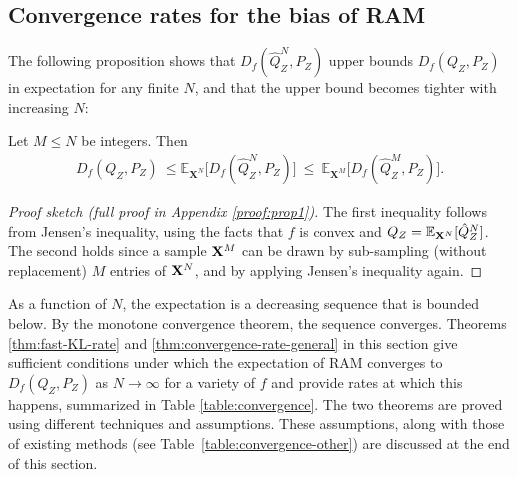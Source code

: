 \subsection{Convergence rates for the bias of RAM}
The following proposition shows that $D_f(\hat{Q}_Z^N , P_Z)$ upper bounds $D_f(Q_{Z} , P_Z)$ in expectation for any finite $N$, and that the upper bound becomes tighter with increasing $N$:
%
\begin{proposition}\label{prop:upper-bound}
Let $M \leq N$ be integers. Then
\begin{align}
\label{eq:our-estimate}
    D_f(Q_Z , P_Z) \ \leq 
    \mathbb{E}_{\mathbf{X}^N} \bigl[D_f(\hat{Q}_Z^N , P_Z)\bigr] \  \leq \ \mathbb{E}_{\mathbf{X}^M} \bigl[D_f(\hat{Q}_Z^M , P_Z)\bigr].
\end{align}
\end{proposition}
\begin{proof}[Proof sketch (full proof in Appendix \ref{proof:prop1})]
The first inequality follows from Jensen's inequality, using the facts that $f$ is convex and ${Q_Z = \mathbb{E}_{\mathbf{X}^N} [\hat{Q}_Z^N}]$.
The second holds since a sample ${\mathbf{X}^M}$ can be drawn by sub-sampling (without replacement) $M$ entries of ${\mathbf{X}^N}$, and by applying Jensen's inequality again.
\end{proof}
As a function of $N$, the expectation is a decreasing sequence that is bounded below.
By the monotone convergence theorem, the sequence converges.
Theorems \ref{thm:fast-KL-rate} and \ref{thm:convergence-rate-general} in this section give sufficient conditions under which the expectation of RAM converges to $D_f(Q_{Z} , P_Z)$ as $N\to\infty$ for a variety of $f$ and provide rates at which this happens, summarized in Table \ref{table:convergence}.
The two theorems are proved using different techniques and assumptions. 
These assumptions, along with those of existing methods (see Table~\ref{table:convergence-other}) are discussed at the end of this section.

